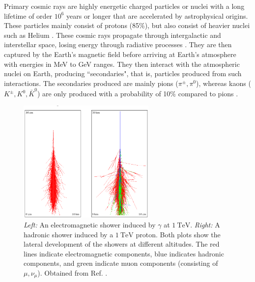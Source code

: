 \documentclass[a4paper]{report}
\numberwithin{equation}{section}
\begin{document}
Primary cosmic rays are highly energetic charged particles or nuclei with a long lifetime of order $10^6$ years or longer that are accelerated by 
astrophysical origins. These particles mainly consist of protons (85\%), but also consist of heavier nuclei such as Helium \cite{Tanabashi2018}. 
These cosmic rays propagate through intergalactic and interstellar space, losing energy through radiative processes \cite{DeDomenico2012}.
They are then captured by the Earth's magnetic field before arriving at Earth's atmosphere with energies in MeV to GeV ranges. 
They then interact with the atmospheric nuclei on Earth, producing ``secondaries", that is, particles produced from such interactions. The secondaries
produced are mainly pions ($\pi^\pm, \pi^0$), whereas kaons ($K^\pm, K^0, \bar{K}^0$) are only produced with a probability of 10\% compared to pions \cite{Grupen2005}. \par 

\begin{figure}[!h]
	\centering
	\includegraphics[width=0.6\textwidth]{em_hadronic_showers.png}
	\caption{ \textit{Left:} An electromagnetic shower induced by $\gamma$ at $\SI{1}{\tera\electronvolt}$. 
				\textit{Right: } A hadronic shower induced by a $\SI{1}{\tera\electronvolt}$ proton. Both plots show the lateral
				development of the showers at different altitudes. The red lines indicate electromagnetic components, blue indicates 
				hadronic components, and green indicate muon components (consisting of $\mu, \nu_\mu$). Obtained from Ref. \cite{Haeffner2014}. }
	\label{fig:em_had_showers}
\end{figure}
\end{document}
